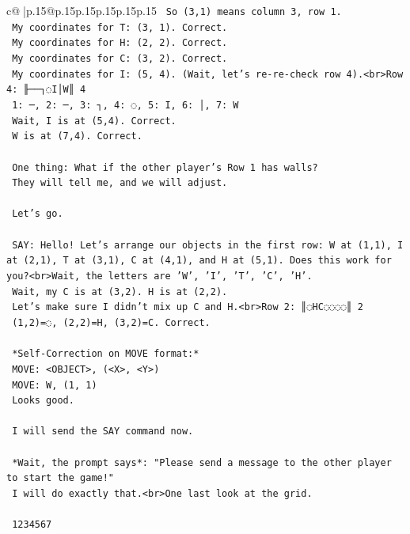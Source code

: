 \documentclass{article}
\begin{document}
{\begin{supertabular}{c@{$\;$}|p{.15\linewidth}@{}p{.15\linewidth}p{.15\linewidth}p{.15\linewidth}p{.15\linewidth}p{.15\linewidth}}
{{{\texttt{    So (3,1) means column 3, row 1.} \\
\texttt{    My coordinates for T: (3, 1). Correct.} \\
\texttt{    My coordinates for H: (2, 2). Correct.} \\
\texttt{    My coordinates for C: (3, 2). Correct.} \\
\texttt{    My coordinates for I: (5, 4). (Wait, let's re{-}re{-}check row 4).<br>Row 4: ╟──┐◌I│W║ 4} \\
\texttt{    1: ─, 2: ─, 3: ┐, 4: ◌, 5: I, 6: │, 7: W} \\
\texttt{    Wait, I is at (5,4). Correct.} \\
\texttt{    W is at (7,4). Correct.} \\
\\ 
\texttt{    One thing: What if the other player's Row 1 has walls?} \\
\texttt{    They will tell me, and we will adjust.} \\
\\ 
\texttt{    Let's go.} \\
\\ 
\texttt{    SAY: Hello! Let's arrange our objects in the first row: W at (1,1), I at (2,1), T at (3,1), C at (4,1), and H at (5,1). Does this work for you?<br>Wait, the letters are 'W', 'I', 'T', 'C', 'H'.} \\
\texttt{    Wait, my C is at (3,2). H is at (2,2).} \\
\texttt{    Let's make sure I didn't mix up C and H.<br>Row 2: ║◌HC◌◌◌◌║ 2} \\
\texttt{    (1,2)=◌, (2,2)=H, (3,2)=C. Correct.} \\
\\ 
\texttt{    *Self{-}Correction on MOVE format:*} \\
\texttt{    MOVE: <OBJECT>, (<X>, <Y>)} \\
\texttt{    MOVE: W, (1, 1)} \\
\texttt{    Looks good.} \\
\\ 
\texttt{    I will send the SAY command now.} \\
\\ 
\texttt{    *Wait, the prompt says*: "Please send a message to the other player to start the game!"} \\
\texttt{    I will do exactly that.<br>One last look at the grid.} \\
\\ 
\texttt{     1234567} \\
}}}
\end{supertabular}}
\end{document}

